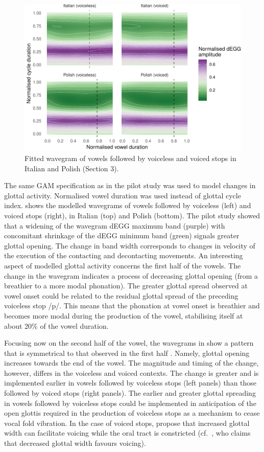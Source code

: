 \documentclass[
  11pt,
  a4paper,
]{article}
\begin{document}
\begin{figure}
\includegraphics[width=\linewidth]{2019-wavegram_files/figure-latex/surface-1} \caption{Fitted wavegram of vowels followed by voiceless and voiced stops in Italian and Polish (Section 3).}\label{f:surface}
\end{figure}

The same GAM specification as in the pilot study was used to model
changes in glottal activity. Normalised vowel duration was used instead
of glottal cycle index.  shows the modelled wavegrams of
vowels followed by voiceless (left) and voiced stops (right), in Italian
(top) and Polish (bottom). The pilot study showed that a widening of the
wavegram dEGG maximum band (purple) with concomitant shrinkage of the
dEGG minimum band (green) signals greater glottal opening. The change in
band width corresponds to changes in velocity of the execution of the
contacting and decontacting movements. An interesting aspect of modelled
glottal activity concerns the first half of the vowels. The change in
the wavegram indicates a process of decreasing glottal opening (from a
breathier to a more modal phonation). The greater glottal spread
observed at vowel onset could be related to the residual glottal spread
of the preceding voiceless stop /p/. This means that the phonation at
vowel onset is breathier and becomes more modal during the production of
the vowel, stabilising itself at about 20\% of the vowel duration.

Focusing now on the second half of the vowel, the wavegrams in
 show a pattern that is symmetrical to that observed in
the first half \citep{halle1967a}. Namely, glottal opening increases
towards the end of the vowel. The magnitude and timing of the change,
however, differs in the voiceless and voiced contexts. The change is
greater and is implemented earlier in vowels followed by voiceless stops
(left panels) than those followed by voiced stops (right panels). The
earlier and greater glottal spreading in vowels followed by voiceless
stops could be implemented in anticipation of the open glottis required
in the production of voiceless stops as a mechanism to cease vocal fold
vibration. In the case of voiced stops, \citet{halle1967a} propose that
increased glottal width can facilitate voicing while the oral tract is
constricted (cf.~\citealt{westbury1983}, who claims that decreased
glottal width favours voicing).
\end{document}
